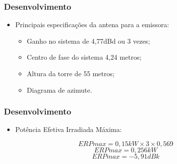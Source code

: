 \documentclass{beamer}
\begin{document}
       \begin{frame}
    
      \frametitle{Desenvolvimento}
      
      
            \begin{itemize}

         \item  Principais especificações da antena para a emissora:
                
          
	\begin{itemize}
	

	  \item Ganho no sistema de 4,77dBd ou 3 vezes;
	  \item Centro de fase do sistema 4,24 metros;
	  \item Altura da torre de 55 metros;
	  \item Diagrama de azimute.
      
      \end{itemize}
   \end{itemize}
    \end{frame}
     
    
   
    
       \begin{frame}
    
      \frametitle{Desenvolvimento}
      
      \begin{itemize}
      
      \item Potência Efetiva Irradiada Máxima:
      
       \end{itemize}
       
       $$ERPmax = 0,15 kW \times 3 \times 0,569$$
       $$ERPmax = 0,256 kW$$
        $$ERPmax = -5,91 dBk$$
   
 
    \end{frame}
    
    
    
      
      
         
         
	
      
\end{document}
